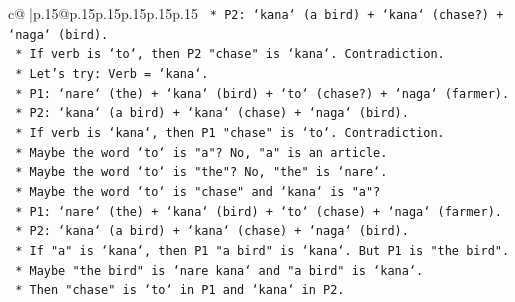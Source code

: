 \documentclass{article}
\begin{document}
{\begin{supertabular}{c@{$\;$}|p{.15\linewidth}@{}p{.15\linewidth}p{.15\linewidth}p{.15\linewidth}p{.15\linewidth}p{.15\linewidth}}
{{{\texttt{                                                                                *   P2: `kana` (a bird) + `kana` (chase?) + `naga` (bird).} \\
\texttt{                                                                                *   If verb is `to`, then P2 "chase" is `kana`. Contradiction.} \\
\texttt{                                                                            *   Let's try: Verb = `kana`.} \\
\texttt{                                                                                *   P1: `nare` (the) + `kana` (bird) + `to` (chase?) + `naga` (farmer).} \\
\texttt{                                                                                *   P2: `kana` (a bird) + `kana` (chase) + `naga` (bird).} \\
\texttt{                                                                                *   If verb is `kana`, then P1 "chase" is `to`. Contradiction.} \\
\texttt{                                                                            *   Maybe the word `to` is "a"? No, "a" is an article.} \\
\texttt{                                                                            *   Maybe the word `to` is "the"? No, "the" is `nare`.} \\
\texttt{                                                                            *   Maybe the word `to` is "chase" and `kana` is "a"?} \\
\texttt{                                                                                *   P1: `nare` (the) + `kana` (bird) + `to` (chase) + `naga` (farmer).} \\
\texttt{                                                                                *   P2: `kana` (a bird) + `kana` (chase) + `naga` (bird).} \\
\texttt{                                                                                *   If "a" is `kana`, then P1 "a bird" is `kana`. But P1 is "the bird".} \\
\texttt{                                                                                *   Maybe "the bird" is `nare kana` and "a bird" is `kana`.} \\
\texttt{                                                                                *   Then "chase" is `to` in P1 and `kana` in P2.} \\
}}}
\end{supertabular}}
\end{document}
